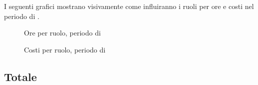 I seguenti grafici mostrano visivamente come influiranno i ruoli per ore e costi nel periodo di \VV{}.
\begin{figure}[H]
	\centering
	\caption{Ore per ruolo, periodo di \VV}
\end{figure}
\begin{figure}[H]
	\centering
	\caption{Costi per ruolo, periodo di \VV}
\end{figure}

\subsection{Totale}
